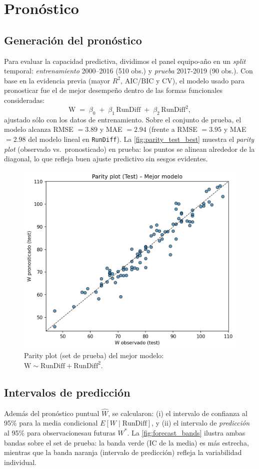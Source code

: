 \documentclass[10pt]{article}
\begin{document}
\section{Pronóstico}
\subsection{Generación del pronóstico}
Para evaluar la capacidad predictiva, dividimos el panel equipo-año en un \textit{split} temporal:
\emph{entrenamiento} 2000–2016 (510 obs.) y \emph{prueba} 2017-2019 (90 obs.). Con base en la evidencia previa (mayor $R^2$, AIC/BIC y CV), el modelo usado para 
pronosticar fue el de mejor desempeño dentro de las formas funcionales consideradas:
\[
\text{W} \;=\; \beta_0 \;+\; \beta_1\,\text{RunDiff}\;+\;\beta_2\,\text{RunDiff}^2,
\]
ajustado sólo con los datos de entrenamiento. Sobre el conjunto de prueba, el modelo alcanza
RMSE \(=3.89\) y MAE \(=2.94\) (frente a RMSE \(=3.95\) y MAE \(=2.98\) del modelo lineal en \texttt{RunDiff}).
La \autoref{fig:parity_test_best} muestra el \textit{parity plot} (observado vs.\ pronosticado) en prueba:
los puntos se alinean alrededor de la diagonal, lo que refleja buen ajuste predictivo sin sesgos evidentes.

\begin{figure}[H]
    \centering
    \includegraphics[width=0.5\linewidth]{../plots/forecast_parity_test_best.png}
    \caption{Parity plot (set de prueba) del mejor modelo: \( \text{W} \sim \text{RunDiff} + \text{RunDiff}^2 \).}
    \label{fig:parity_test_best}
\end{figure}

\subsection{Intervalos de predicción}
Además del pronóstico puntual \(\hat{W}\), se calcularon:
(i) el intervalo de confianza al 95\% para la media condicional \(E[W \mid \text{RunDiff}]\), y
(ii) el intervalo de \emph{predicción} al 95\% para observacionesau futuras \(W^\ast\).
La \autoref{fig:forecast_bands} ilustra ambas bandas sobre el set de prueba: la banda verde (IC de la media) es más estrecha, mientras que la banda naranja (intervalo de predicción) refleja la variabilidad individual.
\end{document}
